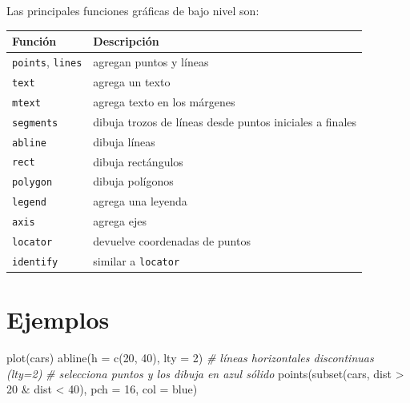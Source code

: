 \documentclass[
]{book}
\newenvironment{Shaded}{\begin{snugshade}}{\end{snugshade}}
\newcommand{\AttributeTok}[1]{\textcolor[rgb]{0.77,0.63,0.00}{#1}}
\newcommand{\CommentTok}[1]{\textcolor[rgb]{0.56,0.35,0.01}{\textit{#1}}}
\newcommand{\DecValTok}[1]{\textcolor[rgb]{0.00,0.00,0.81}{#1}}
\newcommand{\FunctionTok}[1]{\textcolor[rgb]{0.00,0.00,0.00}{#1}}
\newcommand{\NormalTok}[1]{#1}
\newcommand{\SpecialCharTok}[1]{\textcolor[rgb]{0.00,0.00,0.00}{#1}}
\newcommand{\StringTok}[1]{\textcolor[rgb]{0.31,0.60,0.02}{#1}}
\theoremstyle{break}
\theoremstyle{nonumberplain}
\begin{document}
Las principales funciones gráficas de bajo nivel son:

\begin{longtable}[]{@{}
  >{\raggedright\arraybackslash}p{}
  >{\raggedright\arraybackslash}p{}@{}}
\toprule
Función & Descripción \\
\midrule
\endhead
\texttt{points}, \texttt{lines} & agregan puntos y líneas \\
\texttt{text} & agrega un texto \\
\texttt{mtext} & agrega texto en los márgenes \\
\texttt{segments} & dibuja trozos de líneas desde puntos
iniciales a finales \\
\texttt{abline} & dibuja líneas \\
\texttt{rect} & dibuja rectángulos \\
\texttt{polygon} & dibuja polígonos \\
\texttt{legend} & agrega una leyenda \\
\texttt{axis} & agrega ejes \\
\texttt{locator} & devuelve coordenadas de puntos \\
\texttt{identify} & similar a \texttt{locator} \\
\bottomrule
\end{longtable}

\hypertarget{ejemplos-1}{%
\section{Ejemplos}\label{ejemplos-1}}

\begin{Shaded}
\begin{Highlighting}[]
\FunctionTok{plot}\NormalTok{(cars)}
\FunctionTok{abline}\NormalTok{(}\AttributeTok{h =} \FunctionTok{c}\NormalTok{(}\DecValTok{20}\NormalTok{, }\DecValTok{40}\NormalTok{), }\AttributeTok{lty =} \DecValTok{2}\NormalTok{) }\CommentTok{\# líneas horizontales discontinuas (lty=2)}
\CommentTok{\# selecciona puntos y los dibuja en azul sólido}
\FunctionTok{points}\NormalTok{(}\FunctionTok{subset}\NormalTok{(cars, dist }\SpecialCharTok{\textgreater{}} \DecValTok{20} \SpecialCharTok{\&}\NormalTok{ dist }\SpecialCharTok{\textless{}} \DecValTok{40}\NormalTok{), }\AttributeTok{pch =} \DecValTok{16}\NormalTok{, }\AttributeTok{col =} \StringTok{\textquotesingle{}blue\textquotesingle{}}\NormalTok{) }
\end{Highlighting}
\end{Shaded}
\end{document}
